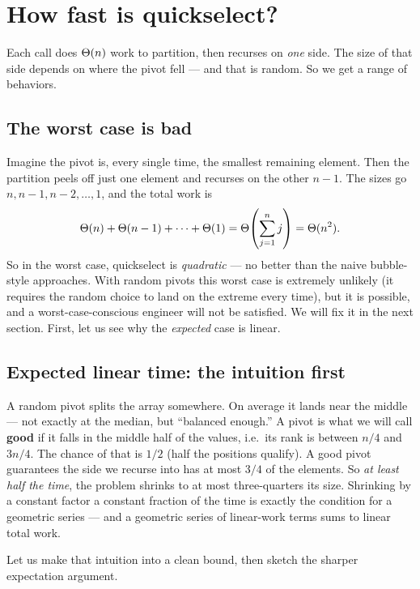 \section{How fast is quickselect?}

Each call does $\Theta(n)$ work to partition, then
recurses on \emph{one} side. The size of that side depends on where the pivot fell
--- and that is random. So we get a range of behaviors.

\subsection{The worst case is bad}

Imagine the pivot is, every single time, the smallest remaining element. Then the
partition peels off just one element and recurses on the other $n-1$. The sizes go
$n, n-1, n-2, \ldots, 1$, and the total work is
\[
\Theta(n) + \Theta(n-1) + \cdots + \Theta(1) = \Theta\!\left(\sum_{j=1}^{n} j\right) = \Theta(n^2).
\]
So in the worst case, quickselect is \emph{quadratic} --- no better than the naive
bubble-style approaches. With random pivots this worst case is extremely
unlikely (it requires the random choice to land on the extreme every time), but it
is possible, and a worst-case-conscious engineer will not be satisfied. We will fix
it in the next section. First, let us see why the \emph{expected} case is linear.

\subsection{Expected linear time: the intuition first}

\begin{intuitionbox}
A random pivot splits the array somewhere. On average it lands near the middle ---
not exactly at the median, but ``balanced enough.'' A pivot is what we will call
\textbf{good} if it falls in the middle half of the values, i.e.\ its rank is
between $n/4$ and $3n/4$. The chance of that is $1/2$ (half the positions qualify).
A good pivot guarantees the side we recurse into has at most $3/4$ of the elements.
So \emph{at least half the time}, the problem shrinks to at most three-quarters its
size. Shrinking by a constant factor a constant fraction of the time is exactly the
condition for a geometric series --- and a geometric series of linear-work terms
sums to linear total work.
\end{intuitionbox}

Let us make that intuition into a clean bound, then sketch the sharper expectation
argument.


